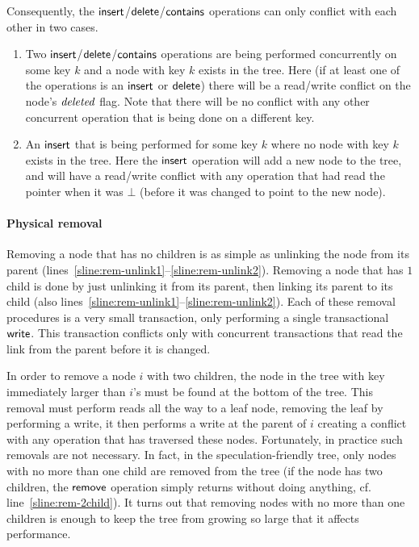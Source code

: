 Consequently, the $\act{insert}$/$\act{delete}$/$\act{contains}$ operations can only conflict with each other in two cases.
\begin{enumerate}
  \item Two $\act{insert}$/$\act{delete}$/$\act{contains}$ operations are being performed concurrently on some key $k$ and a node with key $k$ exists in the tree.
	Here (if at least one of the operations is an $\act{insert}$ or $\act{delete}$) there will be a read/write conflict on the node's $\ms{deleted}$ flag.
	Note that there will be no conflict with any other concurrent operation that is being done on a different key.
  \item An $\act{insert}$ that is being performed for some key $k$ where no node with key $k$ exists in the tree.
	Here the $\act{insert}$ operation will add a new node to the tree, and will have a read/write conflict with any operation that had read
	the pointer when it was $\bot$ (before it was changed to point to the new node).
\end{enumerate}

%



\paragraph{Physical removal}
Removing a node that has no children is as simple as unlinking the node from its parent (lines~\ref{sline:rem-unlink1}--\ref{sline:rem-unlink2}).
Removing a node that has $1$ child is done by just unlinking it from its parent, then linking its parent to its child (also lines~\ref{sline:rem-unlink1}--\ref{sline:rem-unlink2}).
Each of these removal procedures is a very small transaction, only performing a single transactional $\act{write}$.
This transaction conflicts only with concurrent transactions that read the link from the parent before it is changed.

In order to remove a node $i$ with two children, the node in the tree with key immediately larger than $i$'s must be found
at the bottom of the tree. This removal must perform reads all the way to a leaf node, removing the leaf by performing a write, it 
then performs a write at the parent of $i$ creating a conflict with any operation that has traversed these nodes.
Fortunately, in practice such removals are not necessary.
In fact, in the speculation-friendly tree, only nodes with no more than one child are removed from the tree 
(if the node has two children, the $\act{remove}$ operation simply returns without doing anything, cf. line~\ref{sline:rem-2child}).
It turns out that removing nodes with no more than one children is enough to keep the tree from growing so large that it affects performance.

